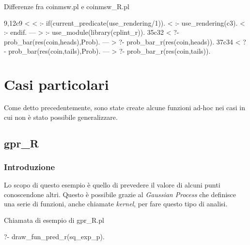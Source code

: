 \documentclass[10pt,titlepage,twoside,a4paper]{report}
\newenvironment{code}{\singlespacing\captionsetup{type=listing}}{}
\begin{document}
\begin{minipage}{\textwidth}
\centering
\begin{code}
\caption{Differenze fra coinmsw.pl e coinmsw\_R.pl}
\label{lst:diffcoinmsw}
\begin{prologcode*}{}
9,12c9
< 
< :- if(current_predicate(use_rendering/1)).
< :- use_rendering(c3).
< :- endif.
---
> :- use_module(library(cplint_r)).
35c32
< ?- prob_bar(res(coin,heads),Prob).  %
---
> ?- prob_bar_r(res(coin,heads)).  %
37c34
< ?- prob_bar(res(coin,tails),Prob).  %
---
> ?- prob_bar_r(res(coin,tails)).  %
\end{prologcode*}
\end{code}
\end{minipage}

\section{Casi particolari} \label{sec:casiParticolari}
Come detto precedentemente, sono state create alcune funzioni ad-hoc
nei casi in cui non è stato possibile generalizzare.

\subsection{gpr\_R}
\subsubsection{Introduzione}
Lo scopo di questo esempio è quello di prevedere il valore di alcuni punti 
conoscendone altri. Questo è possibile grazie al \emph{Gaussian Process} che 
definisce una serie di funzioni, anche chiamate \emph{kernel}, per fare questo 
tipo di analisi.

\begin{minipage}{\textwidth}
\centering
\begin{code}
\caption{Chiamata di esempio di gpr\_R.pl}
\label{lst:gprRExample}
\begin{prologcode*}{}
?- draw_fun_pred_r(sq_exp_p).
\end{prologcode*}
\end{code}
\end{minipage}
\end{document}
